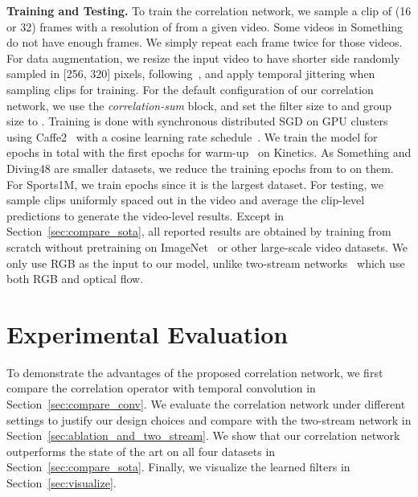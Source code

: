 \documentclass[10pt,twocolumn,letterpaper]{article}
\begin{document}
\noindent\textbf{Training and Testing.} To train the correlation network, we sample a clip of  (16 or 32) frames with a resolution of  from a given video. Some videos in Something do not have enough frames. We simply repeat each frame twice for those videos. 
For data augmentation, we resize the input video to have shorter
side randomly sampled in [256, 320] pixels, following~\cite{wang2017non,SimonyanZ14a}, and apply temporal jittering when sampling clips for training. For the default configuration of our correlation network, we use the \textit{correlation-sum} block, and set the filter size to  and group size to .
Training is done with synchronous distributed SGD on GPU clusters using Caffe2~\cite{caffe2} with a cosine learning rate schedule~\cite{loshchilov2016sgdr}. We train the model for  epochs in total with the first  epochs for warm-up~\cite{goyal2017accurate} on Kinetics. As Something and Diving48 are smaller datasets, we reduce the training epochs from  to  on them.  For Sports1M, we train  epochs since it is the largest dataset. For testing, we sample  clips uniformly spaced out in the video and average the clip-level predictions to generate the video-level results.  Except in Section~\ref{sec:compare_sota}, all reported results are obtained by training from scratch without pretraining on ImageNet~\cite{deng2009imagenet} or other large-scale video datasets. We only use RGB as the input to our model, unlike two-stream networks~\cite{SimonyanZ14,wang2015towards,FeichtenhoferPZ16,WangXW0LTG16} which use both RGB and optical flow.  \section{Experimental Evaluation}\label{sec:exp_results}

To demonstrate the advantages of the proposed correlation network, we first compare the correlation operator with temporal convolution in Section~\ref{sec:compare_conv}. We evaluate the correlation network under different  settings to justify our design choices and compare with the two-stream network in Section~\ref{sec:ablation_and_two_stream}. We show that our correlation network outperforms the state of the art on all four datasets in Section~\ref{sec:compare_sota}. Finally, we visualize the learned filters in Section~\ref{sec:visualize}.
\end{document}

